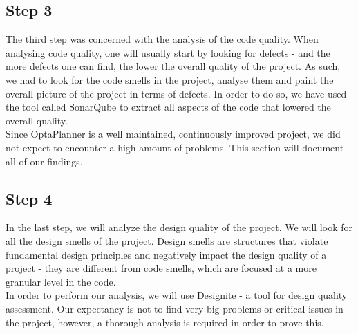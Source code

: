 \subsection{Step 3}
    The third step was concerned with the analysis of the code quality. When analysing code quality, one will usually start by looking for defects - and the more defects one can find, the lower the overall quality of the project. As such, we had to look for the code smells in the project, analyse them and paint the overall picture of the project in terms of defects. In order to do so, we have used the tool called SonarQube to extract all aspects of the code that lowered the overall quality.\\
    Since OptaPlanner is a well maintained, continuously improved project, we did not expect to encounter a high amount of problems. This section will document all of our findings.
\subsection{Step 4}
    In the last step, we will analyze the design quality of the project. We will look for all the design smells of the project. Design smells are structures that violate fundamental design principles and negatively impact the design quality of a project - they are different from code smells, which are focused at a more granular level in the code.\\
    In order to perform our analysis, we will use Designite - a tool for design quality assessment. Our expectancy is not to find very big problems or critical issues in the project, however, a thorough analysis is required in order to prove this.